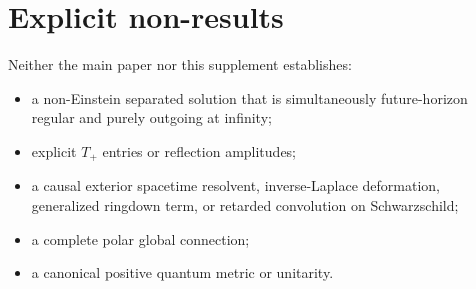 \documentclass[11pt]{article}
\begin{document}
\section{Explicit non-results}

Neither the main paper nor this supplement establishes:
\begin{itemize}
\item a non-Einstein separated solution that is simultaneously
future-horizon regular and purely outgoing at infinity;
\item explicit \(T_+\) entries or reflection amplitudes;
\item a causal exterior spacetime resolvent, inverse-Laplace deformation,
generalized ringdown term, or retarded convolution on
Schwarzschild;
\item a complete polar global connection;
\item a canonical positive quantum metric or unitarity.
\end{itemize}
\end{document}
